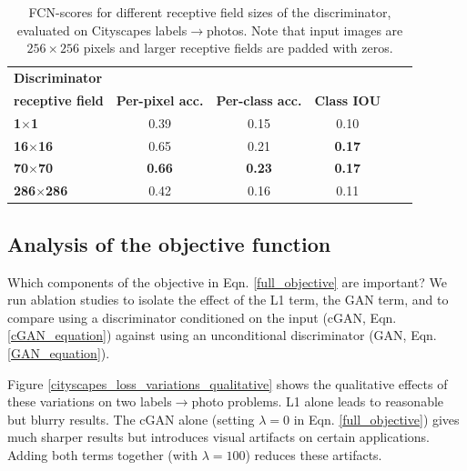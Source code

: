 \documentclass[10pt,twocolumn,letterpaper]{article}
\begin{document}
\begin{table}
\centering
\scalebox{0.75} {
\begin{tabular}{lccccc}
\textbf{Discriminator} & & & \\
\textbf{receptive field} & \textbf{Per-pixel acc.} & \textbf{Per-class acc.} & \textbf{Class IOU} \\ \hline
\textbf{1$\times$1} & 0.39 & 0.15 & 0.10 \\
\textbf{16$\times$16} & 0.65 & 0.21 & \textbf{0.17}  \\
\textbf{70$\times$70} & \textbf{0.66} & \textbf{0.23} & \textbf{0.17}  \\
\textbf{286$\times$286} & 0.42 & 0.16 & 0.11 \\
\end{tabular} }
\vspace{-0.1in}
\caption {FCN-scores for different receptive field sizes of the discriminator, evaluated on Cityscapes labels$\rightarrow$photos. Note that input images are $256 \times 256$ pixels and larger receptive fields are padded with zeros.}
\vspace{-0.2in}
\label{tab:patchsize_variations}
\end{table}





\subsection{Analysis of the objective function}

Which components of the objective in Eqn. \ref{full_objective} are important? We run ablation studies to isolate the effect of the L1 term, the GAN term, and to compare using a discriminator conditioned on the input (cGAN, Eqn. \ref{cGAN_equation}) against using an unconditional discriminator (GAN, Eqn. \ref{GAN_equation}).

Figure \ref{cityscapes_loss_variations_qualitative} shows the qualitative effects of these variations on two labels$\rightarrow$photo problems. L1 alone leads to reasonable but blurry results. The cGAN alone (setting $\lambda=0$ in Eqn. \ref{full_objective}) gives much sharper results but introduces visual artifacts on certain applications. Adding both terms together (with $\lambda=100$) reduces these artifacts.
\end{document}
